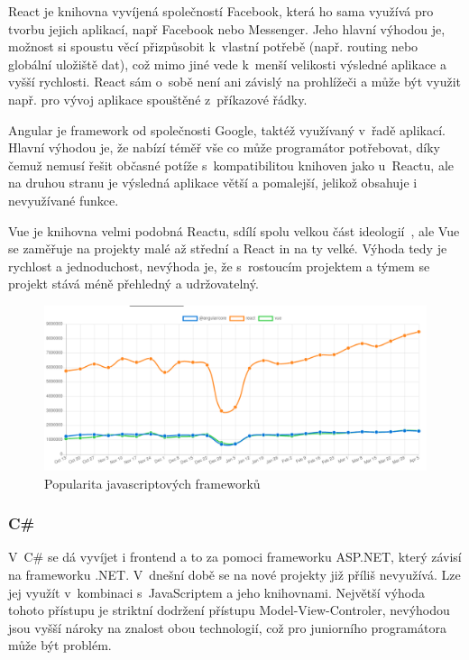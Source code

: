 React je knihovna vyvíjená společností Facebook, která ho sama využívá pro tvorbu jejich aplikací, např Facebook nebo Messenger. Jeho hlavní výhodou je, možnost si spoustu věcí přizpůsobit k~vlastní potřebě (např. routing nebo globální uložiště dat), což mimo jiné vede k~menší velikosti výsledné aplikace a vyšší rychlosti. React sám o~sobě není ani závislý na prohlížeči a může být využit např. pro vývoj aplikace spouštěné z~příkazové řádky.

Angular je framework od společnosti Google, taktéž využívaný v~řadě aplikací. Hlavní výhodou je, že nabízí téměř vše co může programátor potřebovat, díky čemuž nemusí řešit občasné potíže s~kompatibilitou knihoven jako u~Reactu, ale na druhou stranu je výsledná aplikace větší a pomalejší, jelikož obsahuje i nevyužívané funkce.

Vue je knihovna velmi podobná Reactu, sdílí spolu velkou část ideologií~\cite{you_2014_comparison}, ale Vue se zaměřuje na projekty malé až střední a React in na ty velké. Výhoda tedy je rychlost a jednoduchost, nevýhoda je, že s~rostoucím projektem a týmem se projekt stává méně přehledný a udržovatelný.

\begin{figure}
    \centering
    \includegraphics[width=\textwidth]{assets/popularity_plot.png}
    \caption[Popularita javascriptových frameworků]{Popularita javascriptových frameworků \cite{potter_2020_npm}}
    \label{fig:popularity_plot}
\end{figure}

\subsubsection*{C\# }
V~C\# se dá vyvíjet i frontend a to za pomoci frameworku ASP.NET, který závisí na frameworku .NET. V~dnešní době se na nové projekty již příliš nevyužívá. Lze jej využít v~kombinaci s~JavaScriptem a jeho knihovnami. Největší výhoda tohoto přístupu je striktní dodržení přístupu Model-View-Controler, nevýhodou jsou vyšší nároky na znalost obou technologií, což pro juniorního programátora může být problém.

